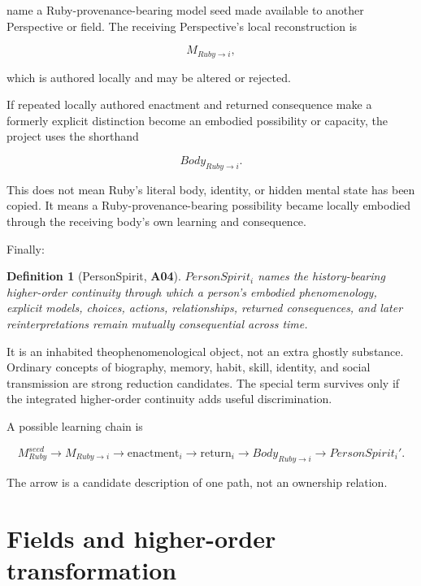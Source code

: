 \documentclass[11pt]{article}
\newtheorem{definition}{Definition}
\newcommand{\claim}[1]{\textsf{\textbf{#1}}}
\begin{document}
name a Ruby-provenance-bearing model seed made available to another Perspective or field. The receiving Perspective's local reconstruction is

\begin{equation}
M_{Ruby\rightarrow i},
\end{equation}

which is authored locally and may be altered or rejected.

If repeated locally authored enactment and returned consequence make a formerly explicit distinction become an embodied possibility or capacity, the project uses the shorthand

\begin{equation}
Body_{Ruby\rightarrow i}.
\end{equation}

This does not mean Ruby's literal body, identity, or hidden mental state has been copied. It means a Ruby-provenance-bearing possibility became locally embodied through the receiving body's own learning and consequence.

Finally:

\begin{definition}[PersonSpirit, \claim{A04}]
$PersonSpirit_i$ names the history-bearing higher-order continuity through which a person's embodied phenomenology, explicit models, choices, actions, relationships, returned consequences, and later reinterpretations remain mutually consequential across time.
\end{definition}

It is an inhabited theophenomenological object, not an extra ghostly substance. Ordinary concepts of biography, memory, habit, skill, identity, and social transmission are strong reduction candidates. The special term survives only if the integrated higher-order continuity adds useful discrimination.

A possible learning chain is

\begin{equation}
M_{Ruby}^{seed}\rightarrow M_{Ruby\rightarrow i}\rightarrow
\text{enactment}_i\rightarrow\text{return}_i\rightarrow
Body_{Ruby\rightarrow i}\rightarrow PersonSpirit_i'.
\end{equation}

The arrow is a candidate description of one path, not an ownership relation.

\section{Fields and higher-order transformation}
\end{document}
